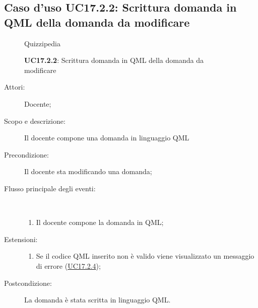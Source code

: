 \subsection{Caso d'uso UC17.2.2: Scrittura domanda in QML della domanda da modificare}
\begin{figure}[H]
	\centering
	\begin{resizedtikzpicture}{\textwidth}
		\begin{umlsystem}[x=0, fill=lightgray!20]{Quizzipedia}
		\end{umlsystem}
	\end{resizedtikzpicture}
	\caption{\textbf{UC17.2.2}: Scrittura domanda in QML della domanda da modificare}
	\label{UC17.2.2}
\end{figure}
\begin{description}
	\item[Attori:] Docente;
	\item[Scopo e descrizione:] Il docente compone una domanda in linguaggio QML
	\item[Precondizione:] Il docente sta modificando una domanda;
	
	\item[Flusso principale degli eventi:] \ 
	\begin{enumerate}
		\item Il docente compone la domanda in QML;
		
	\end{enumerate}
	\item[Estensioni:]
	\begin{enumerate}
		\item Se il codice QML inserito non è valido viene visualizzato un messaggio di errore (\hyperlink{UC17.2.4}{UC17.2.4});
		
	\end{enumerate}
	\item[Postcondizione:] La domanda è stata scritta in linguaggio QML.
\end{description}
\hypertarget{UC17.2.3}{}
